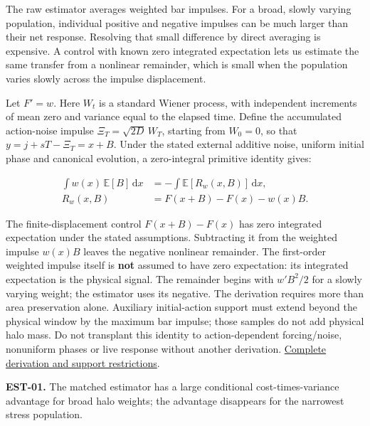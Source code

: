 \documentclass[fleqn,usenatbib]{mnras}
\begin{document}
The raw estimator averages weighted bar impulses. For a broad, slowly varying population, individual positive and negative impulses can be much larger than their net response. Resolving that small difference by direct averaging is expensive. A control with known zero integrated expectation lets us estimate the same transfer from a nonlinear remainder, which is small when the population varies slowly across the impulse displacement.

Let \(F'=w\). Here \(W_t\) is a standard Wiener process, with independent increments of mean zero and variance equal to the elapsed time. Define the accumulated action-noise impulse \(\Xi_T=\sqrt{2D}\,W_T\), starting from \(W_0=0\), so that \(y=j+sT-\Xi_T=x+B\). Under the stated external additive noise, uniform initial phase and canonical evolution, a zero-integral primitive identity gives:

\begin{equation}\label{EQ-EST-01}
\begin{aligned}
\int w(x)\,\mathbb E[B]\,\mathrm dx
&=-\int\mathbb E\!\left[R_w(x,B)\right]\,\mathrm dx,\\
R_w(x,B)&=F(x+B)-F(x)-w(x)B.
\end{aligned}
\end{equation}

The finite-displacement control \(F(x+B)-F(x)\) has zero integrated expectation under the stated assumptions. Subtracting it from the weighted impulse \(w(x)B\) leaves the negative nonlinear remainder. The first-order weighted impulse itself is \textbf{not} assumed to have zero expectation: its integrated expectation is the physical signal. The remainder begins with \(w'B^2/2\) for a slowly varying weight; the estimator uses its negative. The derivation requires more than area preservation alone. Auxiliary initial-action support must extend beyond the physical window by the maximum bar impulse; those samples do not add physical halo mass. Do not transplant this identity to action-dependent forcing/noise, nonuniform phases or live response without another derivation. \href{https://djova.ca/galaxy-bar/methods/CUMULATIVE_IDENTITY.md}{Complete derivation and support restrictions}.

\textbf{EST-01.} The matched estimator has a large conditional cost-times-variance advantage for broad halo weights; the advantage disappears for the narrowest stress population.
\end{document}
